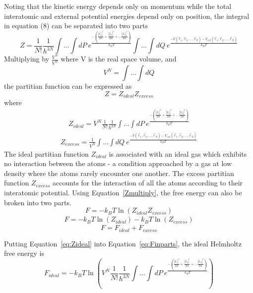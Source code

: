 \documentclass[double,12pt]{beavtex}
\begin{document}
Noting that the kinetic energy depends only on momentum while the total 
interatomic and external potential energies depend only on position, 
the integral in equation (8) can be separated into two parts 
\begin{equation}{Z=\frac{1}{N!}\frac{1}{h^{3N}}\int...\int{dP}~e^\frac{-(\frac{|\vec{p}_1|^2}{2m}+\frac{|\vec{p}_2|^2}{2m}+...\frac{|\vec{p}_N|^2}{2m})}{k_BT}\int...\int{dQ}~e^\frac{-V(\vec{r}_1,\vec{r}_2,{...},\vec{r}_N)-V_{ext}(\vec{r}_1,\vec{r}_2,{...},\vec{r}_N)}{k_BT}}\end{equation}  
Multiplying by $\frac{V^N}{V^N}$ where V is the real space volume, and 
\begin{equation}{V^N=}\int{...}\int{dQ}\end{equation} 
the partitian function can be expressed as
\begin{equation}\label{Zmultiply}{Z=Z_{ideal}Z_{excess}}\end{equation}
where
\begin{align} \label{eq:Zideal}
    Z_{ideal}=V^N\frac{1}{N!}\frac{1}{h^{3N}}\int{...}\int{dP}~e^\frac{-(\frac{|\vec{p}_1|^2}{2m}+ \frac{|\vec{p}_2|^2}{2m}+...\frac{|\vec{p}_N|^2}{2m})}{k_BT}
\end{align}
\begin{align} \label{eq:Zexcess}
    Z_{excess}=\frac{1}{V^N}\int{...}\int{dQ}~e^\frac{-V(\vec{r}_1,\vec{r}_2,{...},\vec{r}_N)-V_{ext}(\vec{r}_1,\vec{r}_2,{...},\vec{r}_N )}{k_BT}
\end{align} 
The ideal partitian function $Z_{ideal}$ is associated with an ideal gas 
which exhibits no interaction between the atoms - a condition approached 
by a gas at low density where the atoms rarely encounter one another. 
The excess partitian function $Z_{excess}$ accounts for the interaction 
of all the atoms according to their interatomic potential. Using 
Equation~\ref{Zmultiply}, the free energy can also be broken into two parts.
\begin{equation}{F=-k_{B}T\ln(Z_{ideal}Z_{excess})}\end{equation}
\begin{align} \label{eq:Finparts}
    F=-k_{B}T\ln(Z_{ideal})-k_{B}T\ln(Z_{excess})
\end{align}
\begin{equation}{F=F_{ideal} + F_{excess}}\end{equation} 

Putting Equation~\ref{eq:Zideal} into Equation~\ref{eq:Finparts}, 
the ideal Helmholtz free energy is
\begin{equation}{F_{ideal}=-k_BT\ln{\left(V^N\frac{1}{N!}\frac{1}{h^{3N}}\int{...}\int{dP}~e^\frac{-(\frac{|\vec{p}_1|^2}{2m}+ \frac{|\vec{p}_2|^2}{2m}+...\frac{|\vec{p}_N|^2}{2m})}{k_BT}\right)}}\end{equation}  
\end{document}
